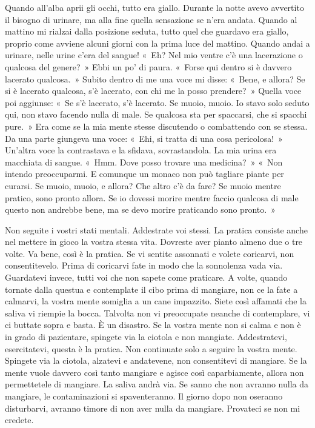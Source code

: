 Quando all'alba aprii gli occhi, tutto era giallo. Durante la notte
avevo avvertito il bisogno di urinare, ma alla fine quella sensazione se
n'era andata. Quando al mattino mi rialzai dalla posizione seduta, tutto
quel che guardavo era giallo, proprio come avviene alcuni giorni con la
prima luce del mattino. Quando andai a urinare, nelle urine c'era del
sangue! «~Eh? Nel mio ventre c'è una lacerazione o qualcosa del
genere?~» Ebbi un po' di paura. «~Forse qui dentro si è davvero lacerato
qualcosa.~» Subito dentro di me una voce mi disse: «~Bene, e allora? Se
si è lacerato qualcosa, s'è lacerato, con chi me la posso prendere?~»
Quella voce poi aggiunse: «~Se s'è lacerato, s'è lacerato. Se muoio,
muoio. Io stavo solo seduto qui, non stavo facendo nulla di male. Se
qualcosa sta per spaccarsi, che si spacchi pure.~» Era come se la mia
mente stesse discutendo o combattendo con se stessa. Da una parte
giungeva una voce: «~Ehi, si tratta di una cosa pericolosa!~» Un'altra
voce la contrastava e la sfidava, sovrastandola. La mia urina era
macchiata di sangue. «~Hmm. Dove posso trovare una medicina?~» «~Non
intendo preoccuparmi. E comunque un monaco non può tagliare piante per
curarsi. Se muoio, muoio, e allora? Che altro c'è da fare? Se muoio
mentre pratico, sono pronto allora. Se io dovessi morire mentre faccio
qualcosa di male questo non andrebbe bene, ma se devo morire praticando
sono pronto.~»

Non seguite i vostri stati mentali. Addestrate voi stessi. La pratica
consiste anche nel mettere in gioco la vostra stessa vita. Dovreste aver
pianto almeno due o tre volte. Va bene, così è la pratica. Se vi sentite
assonnati e volete coricarvi, non consentitevelo. Prima di coricarvi
fate in modo che la sonnolenza vada via. Guardatevi invece, tutti voi
che non sapete come praticare. A volte, quando tornate dalla questua e
contemplate il cibo prima di mangiare, non ce la fate a calmarvi, la
vostra mente somiglia a un cane impazzito. Siete così affamati che la
saliva vi riempie la bocca. Talvolta non vi preoccupate neanche di
contemplare, vi ci buttate sopra e basta. È un disastro. Se la vostra
mente non si calma e non è in grado di pazientare, spingete via la
ciotola e non mangiate. Addestratevi, esercitatevi, questa è la pratica.
Non continuate solo a seguire la vostra mente. Spingete via la ciotola,
alzatevi e andatevene, non consentitevi di mangiare. Se la mente vuole
davvero così tanto mangiare e agisce così caparbiamente, allora non
permettetele di mangiare. La saliva andrà via. Se sanno che non avranno
nulla da mangiare, le contaminazioni si spaventeranno. Il giorno dopo
non oseranno disturbarvi, avranno timore di non aver nulla da mangiare.
Provateci se non mi credete.

